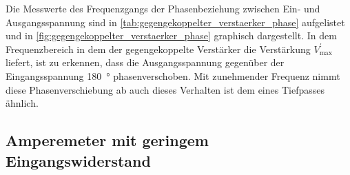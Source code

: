 

Die Messwerte des Frequenzgangs der Phasenbeziehung zwischen Ein- und 
Ausgangsspannung sind in \cref{tab:gegengekoppelter_verstaerker_phase}
aufgelistet und in \cref{fig:gegengekoppelter_verstaerker_phase} graphisch 
dargestellt. In dem Frequenzbereich in dem der gegengekoppelte Verstärker die Verstärkung
$V^{\prime}_{\mathrm{max}}$ liefert, ist zu erkennen, dass die Ausgangsspannung gegenüber der 
Eingangsspannung \SI{180}{\degree} phasenverschoben. Mit zunehmender Frequenz nimmt diese 
Phasenverschiebung ab auch dieses Verhalten ist dem eines Tiefpasses ähnlich.  








\subsection{Amperemeter mit geringem Eingangswiderstand}

